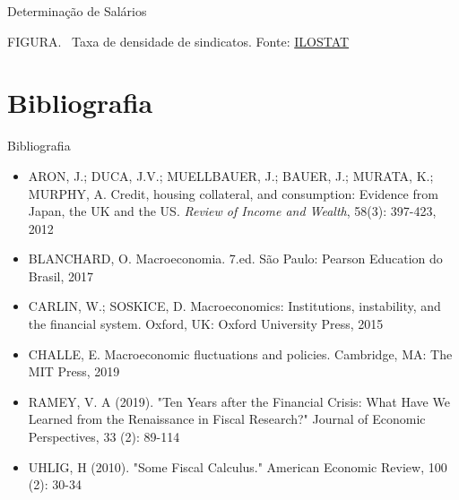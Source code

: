\documentclass[10pt]{beamer}
\begin{document}
\begin{frame}{Determinação de Salários}
    \begin{center}
		\begin{minipage}[b]{.6\textwidth}
			\tiny{{\scshape FIGURA}. \ Taxa de densidade de sindicatos. Fonte: \href{https://ilostat.ilo.org/topics/union-membership/}{ILOSTAT}} 
		\end{minipage}
	\end{center}
\end{frame}

\section{Bibliografia}
\begin{frame}{ Bibliografia}
    \begin{itemize}        
        \item ARON, J.; DUCA, J.V.; MUELLBAUER, J.; BAUER, J.; MURATA, K.; MURPHY, A. Credit, housing collateral, and consumption: Evidence from Japan, the UK and the US. \emph{Review of Income and Wealth}, 58(3): 397-423, 2012\medskip
        \item BLANCHARD, O. Macroeconomia. 7.ed. São Paulo: Pearson Education do Brasil, 2017\medskip                
        \item CARLIN, W.; SOSKICE, D. Macroeconomics: Institutions, instability, and the financial system. Oxford, UK: Oxford University Press, 2015\medskip
        \item CHALLE, E. Macroeconomic fluctuations and policies. Cambridge, MA: The MIT Press, 2019\medskip        
        \item RAMEY, V. A (2019). "Ten Years after the Financial Crisis: What Have We Learned from the Renaissance in Fiscal Research?" Journal of Economic Perspectives, 33 (2): 89-114\medskip
        \item UHLIG, H (2010). "Some Fiscal Calculus." American Economic Review, 100 (2): 30-34
    \end{itemize}
\end{frame}
\end{document}
